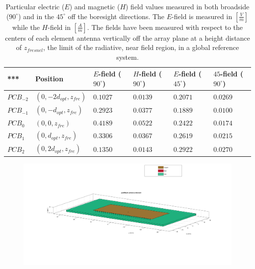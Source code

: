 \documentclass[12pt,a4paper,twocolumn]{article}
\begin{document}
{%
\begin{table}
	\begin{center}
		{\selectfont	\begin{tabular}{||m{1.8cm}|m{2.6cm}|m{2.6cm}|m{2.6cm}|m{2.6cm}|m{2.6cm}||}
				\hline
				*** & Position & $E$-field ($90^\circ$) & $H$-field ($90^\circ$) & $E$-field ($45^\circ$) & $45$-field ($90^\circ$) \\
						\hline 
			$PCB_{-2}$ & $(0,-2d_{opt},z_{fre})$ & $0.1027$ & $0.0139$ & $0.2071$ & $0.0269$ \\ 
			\hline
				$PCB_{-1}$ & $(0,-d_{opt},z_{fre})$ & $0.2923$ & $0.0377$ & $0.1889$ & $0.0100$ \\
				\hline
				$PCB_0$ & $(0,0,z_{fre})$& $0.4189$& $0.0522$& $0.2422$ & $0.0174$ \\
				\hline 
				$PCB_1$ & $(0,d_{opt},z_{fre})$ & $0.3306$ & $0.0367$ & $0.2619$ & $0.0215$ \\
				\hline 
				$PCB_2$ & $(0,2d_{opt},z_{fre})$ & $0.1350$ & $0.0143$ & $0.2922$ & $0.0270$ \\ 
				\hline
			\end{tabular}}
		\caption{Particular electric ($E$) and magnetic ($H$) field values measured in both broadside ($90^\circ$) and in the $45^\circ$ off the boresight directions. The $E$-field is measured in $\left[\frac{V}{m}\right]$ while the $H$-field in $\left[\frac{A}{m}\right]$. The fields have been measured with respect to the centers of each element antenna vertically off the array plane at a height distance of $z_{fresnel}$, the limit of the radiative, near field region, in a global reference system.}
		\label{table:EH fields}
		\end{center}
	\end{table} 
\begin{center}
	\begin{figure}[h]
		\includegraphics[scale=0.2]{pcb_shorting_pins_3d_view.pdf}

\end{figure}
\end{center}}
\end{document}
